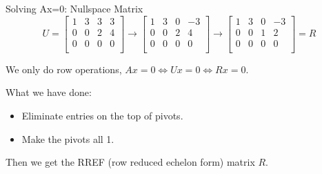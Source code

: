 \documentclass{beamer}
\begin{document}
\begin{frame}{Solving Ax=0: Nullspace Matrix}
\begin{equation*}
    U=\left[ \begin{matrix}
        1&		3&		3&		3\\
        0&		0&		2&		4\\
        0&		0&		0&		0\\
    \end{matrix} \right] \rightarrow \left[ \begin{matrix}
        1&		3&		0&		-3\\
        0&		0&		2&		4\\
        0&		0&		0&		0\\
    \end{matrix} \right] \rightarrow \left[ \begin{matrix}
        1&		3&		0&		-3\\
        0&		0&		1&		2\\
        0&		0&		0&		0\\
    \end{matrix} \right] =R
\end{equation*}

We only do row operations, $Ax=0\Leftrightarrow Ux=0\Leftrightarrow Rx=0$.

\vspace{3pt}
What we have done:
\begin{itemize}
    \item Eliminate entries on the top of pivots.
    \item Make the pivots all 1.
\end{itemize}

Then we get the RREF (row reduced echelon form) matrix $R$.

\end{frame}
\end{document}
